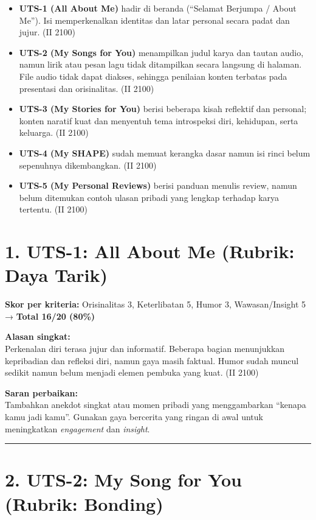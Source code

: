 \documentclass[
  letterpaper,
  DIV=11,
  numbers=noendperiod]{scrreprt}
\providecommand{\tightlist}{%
  \setlength{\itemsep}{0pt}\setlength{\parskip}{0pt}}
\begin{document}
\begin{itemize}
\tightlist
\item
  \textbf{UTS-1 (All About Me)} hadir di beranda (``Selamat Berjumpa /
  About Me''). Isi memperkenalkan identitas dan latar personal secara
  padat dan jujur. (II 2100)
\item
  \textbf{UTS-2 (My Songs for You)} menampilkan judul karya dan tautan
  audio, namun lirik atau pesan lagu tidak ditampilkan secara langsung
  di halaman. File audio tidak dapat diakses, sehingga penilaian konten
  terbatas pada presentasi dan orisinalitas. (II 2100)
\item
  \textbf{UTS-3 (My Stories for You)} berisi beberapa kisah reflektif
  dan personal; konten naratif kuat dan menyentuh tema introspeksi diri,
  kehidupan, serta keluarga. (II 2100)
\item
  \textbf{UTS-4 (My SHAPE)} sudah memuat kerangka dasar namun isi rinci
  belum sepenuhnya dikembangkan. (II 2100)
\item
  \textbf{UTS-5 (My Personal Reviews)} berisi panduan menulis review,
  namun belum ditemukan contoh ulasan pribadi yang lengkap terhadap
  karya tertentu. (II 2100)
\end{itemize}

\section{1. UTS-1: All About Me (Rubrik: Daya
Tarik)}\label{uts-1-all-about-me-rubrik-daya-tarik}

\textbf{Skor per kriteria:} Orisinalitas 3, Keterlibatan 5, Humor 3,
Wawasan/Insight 5 → \textbf{Total 16/20 (80\%)}

\textbf{Alasan singkat:}\\
Perkenalan diri terasa jujur dan informatif. Beberapa bagian menunjukkan
kepribadian dan refleksi diri, namun gaya masih faktual. Humor sudah
muncul sedikit namun belum menjadi elemen pembuka yang kuat. (II 2100)

\textbf{Saran perbaikan:}\\
Tambahkan anekdot singkat atau momen pribadi yang menggambarkan ``kenapa
kamu jadi kamu''. Gunakan gaya bercerita yang ringan di awal untuk
meningkatkan \emph{engagement} dan \emph{insight}.

\begin{center}\rule{0.5\linewidth}{0.5pt}\end{center}

\section{2. UTS-2: My Song for You (Rubrik:
Bonding)}\label{uts-2-my-song-for-you-rubrik-bonding}
\end{document}
